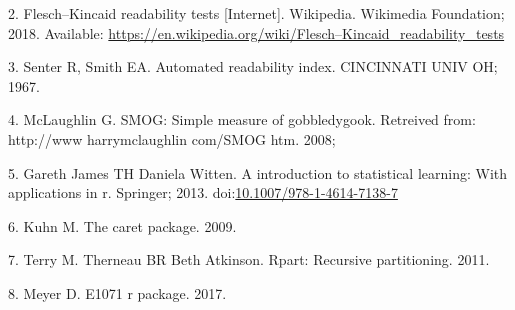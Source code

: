 \documentclass[10pt,letterpaper]{article}
\begin{document}
\hypertarget{ref-wikipedia_2018}{}
2. Flesch--Kincaid readability tests {[}Internet{]}. Wikipedia.
Wikimedia Foundation; 2018. Available:
\url{https://en.wikipedia.org/wiki/Flesch–Kincaid_readability_tests}

\hypertarget{ref-senter1967automated}{}
3. Senter R, Smith EA. Automated readability index. CINCINNATI UNIV OH;
1967.

\hypertarget{ref-mclaughlin2008smog}{}
4. McLaughlin G. SMOG: Simple measure of gobbledygook. Retreived from:
http://www harrymclaughlin com/SMOG htm. 2008;

\hypertarget{ref-MLbook}{}
5. Gareth James TH Daniela Witten. A introduction to statistical
learning: With applications in r. Springer; 2013.
doi:\href{https://doi.org/10.1007/978-1-4614-7138-7}{10.1007/978-1-4614-7138-7}

\hypertarget{ref-Kuhn09thecaret}{}
6. Kuhn M. The caret package. 2009.

\hypertarget{ref-rpart}{}
7. Terry M. Therneau BR Beth Atkinson. Rpart: Recursive partitioning.
2011.

\hypertarget{ref-e1071}{}
8. Meyer D. E1071 r package. 2017.

\nolinenumbers
\end{document}
